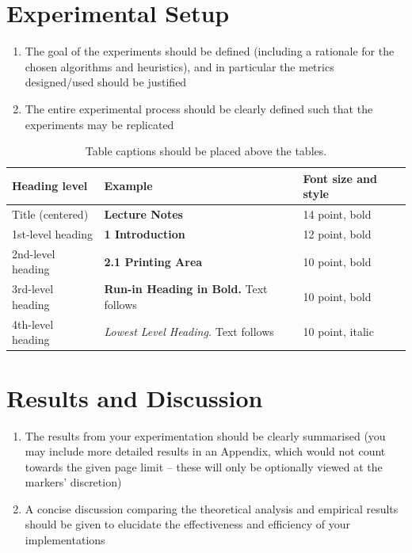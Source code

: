 \documentclass[runningheads]{llncs}
\begin{document}
\section{Experimental Setup}
\begin{enumerate}
\item The goal of the experiments should be defined (including a rationale for the chosen algorithms and heuristics), and in particular the metrics designed/used should be justified
\item The entire experimental process should be clearly defined such that the experiments may be replicated
\end{enumerate}

\begin{table}
\caption{Table captions should be placed above the tables.}\label{tab1}
\begin{tabular}{|l|l|l|}
\hline
Heading level &  Example & Font size and style\\
\hline
Title (centered) &  {\Large\bfseries Lecture Notes} & 14 point, bold\\
1st-level heading &  {\large\bfseries 1 Introduction} & 12 point, bold\\
2nd-level heading & {\bfseries 2.1 Printing Area} & 10 point, bold\\
3rd-level heading & {\bfseries Run-in Heading in Bold.} Text follows & 10 point, bold\\
4th-level heading & {\itshape Lowest Level Heading.} Text follows & 10 point, italic\\
\hline
\end{tabular}
\end{table}



\section{Results and Discussion}
\begin{enumerate}
\item The results from your experimentation should be clearly summarised (you may include more detailed results in an Appendix,
which would not count towards the given page limit – these will only be optionally viewed at the markers’ discretion)
\item A concise discussion comparing the theoretical analysis and empirical results should be given to elucidate the effectiveness and efficiency of your implementations
\end{enumerate}




%
%
%

%
\end{document}
